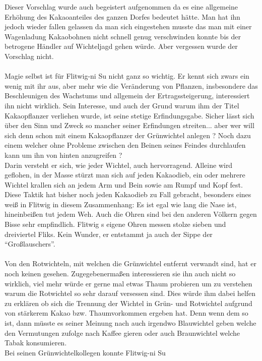 \documentclass[10pt, a4paper]{proc}
\newcommand{\Charname}{Flitwig-ni Su }
\newcommand{\Kurzname}{Flitwig }
\begin{document}
Dieser Vorschlag wurde auch begeistert aufgenommen da es eine
allgemeine Erh{\"o}hung des Kakaoanteiles des ganzen Dorfes bedeutet
h{\"a}tte. Man hat ihn jedoch wieder fallen gelassen da man sich
eingestehen musste das man mit einer Wagenladung Kakaobohnen nicht
schnell genug verschwinden konnte bis der betrogene H{\"a}ndler auf
Wichteljagd gehen w{\"u}rde. Aber vergessen wurde der Vorschlag
nicht.\\\\Magie selbst ist f{\"u}r \Charname nicht ganz so wichtig. Er
kennt sich zwars ein wenig mit ihr aus, aber mehr wie die
Ver{\"a}nderung von Pflanzen, insbesondere das Beschleunigen des
Wachstums und allgemein der Ertragssteigerung, interessiert ihn
nicht wirklich. Sein Interesse, und auch der Grund warum ihm der
Titel Kakaopflanzer verliehen wurde, ist seine stetige
Erfindungsgabe. Sicher l{\"a}sst sich {\"u}ber den Sinn und Zweck so
mancher seiner Erfindungen streiten... aber wer will sich denn
schon mit einem Kakaopflanzer der Gr{\"u}nwichtel anlegen ? Noch dazu
einem welcher ohne Probleme zwischen den Beinen seines Feindes
durchlaufen kann um ihn von hinten anzugreifen ?\\Darin versteht
er sich, wie jeder Wichtel, auch hervorragend. Alleine wird
geflohen, in der Masse st{\"u}rzt man sich auf jeden Kakaodieb, ein
oder mehrere Wichtel krallen sich an jedem Arm und Bein sowie am
Rumpf und Kopf fest. Diese Taktik hat bisher noch jeden Kakaodieb
zu Fall gebracht, besonders eines wei{\ss} in \Kurzname in diesem
Zusammenhang: Es ist egal wie lang die Nase ist, hineinbei{\ss}en tut
jedem Weh. Auch die Ohren sind bei den anderen V{\"o}lkern gegen Bisse
sehr empfindlich. \Kurzname s eigene Ohren messen stolze sieben
und dreiviertel Fliks. Kein Wunder, er entstammt ja auch der Sippe
der "`Gro{\ss}lauschers"'.\\\\Von den Rotwichteln, mit welchen die
Gr{\"u}nwichtel entfernt verwandt sind, hat er noch keinen gesehen.
Zugegebenerma{\ss}en interessieren sie ihn auch nicht so wirklich,
viel mehr w{\"u}rde er gerne mal etwas Thaum probieren um zu verstehen
warum die Rotwichtel so sehr darauf versessen sind. Dies w{\"u}rde ihm
dabei helfen zu erkl{\"a}ren ob sich die Trennung der Wichtel in Gr{\"u}n-
und Rotwichtel aufgrund von st{\"a}rkerem Kakao bzw. Thaumvorkommen
ergeben hat. Denn wenn dem so ist, dann m{\"u}sste es seiner Meinung
nach auch irgendwo Blauwichtel geben welche den Vermutungen
zufolge nach Kaffee gieren oder auch Braunwichtel welche Tabak
konsumieren.\\Bei seinen Gr{\"u}nwichtelkollegen konnte \Charname
\end{document}
